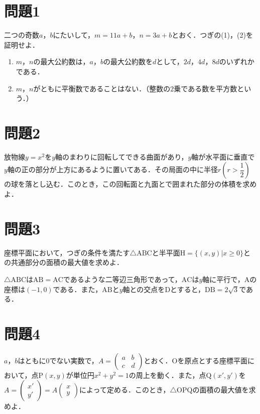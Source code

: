 \documentclass[unicode,12pt, A4j]{ltjsarticle}%
\begin{document}
\section{問題1}
二つの奇数$a$，$b$にたいして，$m=11a+b$，$n=3a+b$とおく．つぎの(1)，(2)を証明せよ．
\begin{enumerate}
 \item $m$，$n$の最大公約数は，$a$，$b$の最大公約数を$d$として，$2d$，$4d$，$8d$のいずれかである．
 \item $m$，$n$がともに平衡数であることはない．（整数の$2$乗である数を平方数という．）
\end{enumerate}

\section{問題2}
放物線$y=x^2$を$y$軸のまわりに回転してできる曲面があり，$y$軸が水平面に垂直で$y$軸の正の部分が上方にあるように置いてある．その局面の中に半径$r \left(r>\dfrac{1}{2}\right)$の球を落とし込む．このとき，この回転面と九面とで囲まれた部分の体積を求めよ．

\section{問題3}
座標平面において，つぎの条件を満たす$\triangle \mathrm{ABC}$と半平面$\mathrm{H}=\{(x,y)|x\ge 0\}$との共通部分の面積の最大値を求めよ．

$\triangle \mathrm{ABC}$は$\mathrm{AB}=\mathrm{AC}$であるような二等辺三角形であって，$\mathrm{AC}$は$y$軸に平行で，$\mathrm{A}$の座標は$(-1,0)$である．また，$\mathrm{AB}$と$y$軸との交点を$\mathrm{D}$とすると，$\mathrm{DB}=2\sqrt{3}$である．

\section{問題4}
$a$，$b$はともに$0$でない実数で，$A=\begin{pmatrix} a&b\\c&d \end{pmatrix}$とおく．$\mathrm{O}$を原点とする座標平面において，点$\mathrm{P}(x,y)$が単位円$x^2+y^2=1$の周上を動く．また，点$\mathrm{Q}(x',y')$を$A=\begin{pmatrix} x'\\y'\end{pmatrix}=A\begin{pmatrix} x\\y\end{pmatrix}$によって定める．このとき，$\triangle \mathrm{OPQ}$の面積の最大値を求めよ．
\end{document}
